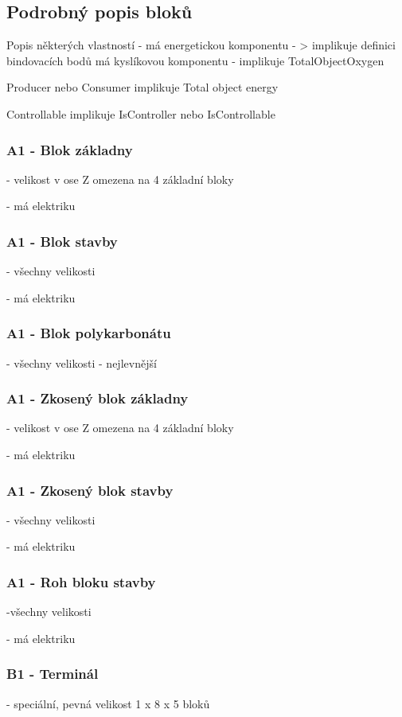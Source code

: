 \subsection{Podrobný popis bloků}

Popis některých vlastností - má energetickou komponentu - > implikuje definici bindovacích bodů
má kyslíkovou komponentu - implikuje TotalObjectOxygen

Producer nebo Consumer implikuje Total object energy

Controllable implikuje IsController nebo IsControllable



\subsubsection{A1 - Blok základny}
- velikost v ose Z omezena na 4 základní bloky

- má elektriku

\subsubsection{A1 - Blok stavby}
- všechny velikosti

- má elektriku

\subsubsection{A1 - Blok polykarbonátu}
- všechny velikosti
- nejlevnější

\subsubsection{A1 - Zkosený blok základny}
- velikost v ose Z omezena na 4 základní bloky

- má elektriku
\subsubsection{A1 - Zkosený blok stavby}
- všechny velikosti

- má elektriku
\subsubsection{A1 - Roh bloku stavby}
-všechny velikosti

- má elektriku

\subsubsection{B1 - Terminál}
- speciální, pevná velikost 1 x 8 x 5 bloků

